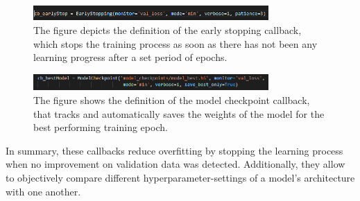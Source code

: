 \begin{figure}[H]
  \begin{center}
  \includegraphics[angle=0, width=0.8\textwidth]{Figures/EarlyStopping.PNG}
  \caption[EarlyStoping callback]{The figure depicts the definition of the early stopping callback, which stops the training process as soon as there has not been any learning progress after a set period of epochs.}
  \label{fig:EarlyStopping}
  \end{center}
\end{figure}

\begin{figure}[H]
  \begin{center}
  \includegraphics[angle=0, width=0.8\textwidth]{Figures/ModelCheckpoint.PNG}
  \caption[Model checkpoint callback]{The figure shows the definition of the model checkpoint callback, that tracks and automatically saves the weights of the model for the best performing training epoch.}
  \label{fig:ModelCheckpoint}
  \end{center}
\end{figure}

In summary, these callbacks reduce overfitting by stopping the learning process when no improvement on validation data was detected. Additionally, they allow to objectively compare different hyperparameter-settings of a model's architecture with one another.
